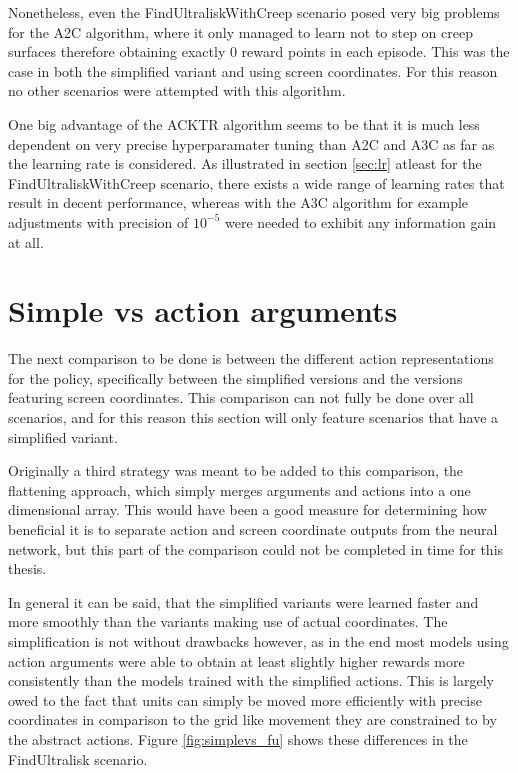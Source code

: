 Nonetheless, even the FindUltraliskWithCreep scenario posed very big problems for the A2C algorithm, where it only managed to learn not to step on creep surfaces therefore obtaining exactly 0 reward points in each episode. This was the case in both the simplified variant and using screen coordinates. For this reason no other scenarios were attempted with this algorithm.

One big advantage of the ACKTR algorithm seems to be that it is much less dependent on very precise hyperparamater tuning than A2C and A3C as far as the learning rate is considered. As illustrated in section \ref{sec:lr} atleast for the FindUltraliskWithCreep scenario, there exists a wide range of learning rates that result in decent performance, whereas with the A3C algorithm for example adjustments with precision of $10^{-5}$ were needed to exhibit any information gain at all. 

\section{Simple vs action arguments}
\label{sec:eval_aa}
The next comparison to be done is between the different action representations for the policy, specifically between the simplified versions and the versions featuring screen coordinates.
This comparison can not fully be done over all scenarios, and for this reason this section will only feature scenarios that have a simplified variant. 

Originally a third strategy was meant to be added to this comparison, the flattening approach, which simply merges arguments and actions into a one dimensional array. This would have been a good measure for determining how beneficial it is to separate action and screen coordinate outputs from the neural network, but this part of the comparison could not be completed in time for this thesis.

In general it can be said, that the simplified variants were learned faster and more smoothly than the variants making use of actual coordinates. The simplification is not without drawbacks however, as in the end most models using action arguments were able to obtain at least slightly higher rewards more consistently than the models trained with the simplified actions. This is largely owed to the fact that  units can simply be moved more efficiently with precise coordinates in comparison to the grid like movement they are constrained to by the abstract actions. Figure \ref{fig:simplevs_fu} shows these differences in the FindUltralisk scenario.

